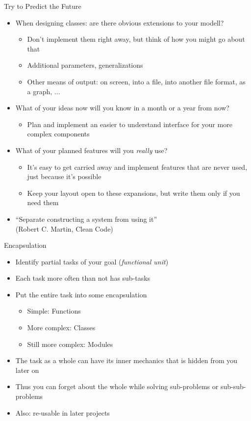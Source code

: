 
\begin{frame}{Try to Predict the Future}
%
\begin{itemize}
\item When designing classes: are there obvious extensions to your modell?
	\begin{itemize}
	\item Don't implement them right away, but think of how you might go about that
	\item Additional parameters, generalizations
	\item Other means of output: on screen, into a file, into another file format, as a graph, ...
	\end{itemize}
\item What of your ideas now will you know in a month or a year from now?
	\begin{itemize}
	\item Plan and implement an easier to understand interface for your more complex components
	\end{itemize}
\item What of your planned features will you \emph{really} use?
	\begin{itemize}
	\item It's easy to get carried away and implement features that are never used, just because it's possible
	\item Keep your layout open to these expansions, but write them only if you need them
	\end{itemize}
\item \enquote{Separate constructing a system from using it}\\
	(Robert C. Martin, Clean Code)
\end{itemize}
%
\end{frame}


\begin{frame}{Encapsulation}
%
\begin{itemize}
\item Identify partial tasks of your goal (\emph{functional unit})
\item Each task more often than not has sub-tasks
\item Put the entire task into some encapsulation
	\begin{itemize}
	\item Simple: Functions
	\item More complex: Classes
	\item Still more complex: Modules
	\end{itemize}
\item The task as a whole can have its inner mechanics that is hidden from you later on
\item Thus you can forget about the whole while solving sub-problems or sub-sub-problems
\item Also: re-usable in later projects
\end{itemize}
%
\end{frame}

